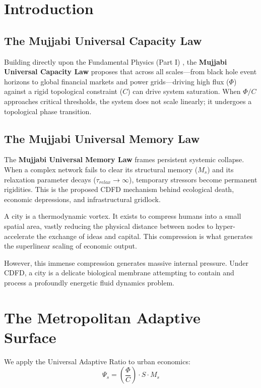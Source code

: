 \documentclass[11pt,a4paper]{article}
\begin{document}
\section{Introduction}

\subsection{The Mujjabi Universal Capacity Law}
Building directly upon the Fundamental Physics (Part I) \cite{MujjabiPartI2026}, the \textbf{Mujjabi Universal Capacity Law} proposes that across all scales---from black hole event horizons to global financial markets and power grids---driving high flux ($\Phi$) against a rigid topological constraint ($C$) can drive system saturation. When $\Phi/C$ approaches critical thresholds, the system does not scale linearly; it undergoes a topological phase transition.

\subsection{The Mujjabi Universal Memory Law}
The \textbf{Mujjabi Universal Memory Law} frames persistent systemic collapse. When a complex network fails to clear its structural memory ($M_s$) and its relaxation parameter decays ($\tau_{relax} \to \infty$), temporary stressors become permanent rigidities. This is the proposed CDFD mechanism behind ecological death, economic depressions, and infrastructural gridlock.

A city is a thermodynamic vortex. It exists to compress humans into a small spatial area, vastly reducing the physical distance between nodes to hyper-accelerate the exchange of ideas and capital. This compression is what generates the superlinear scaling of economic output.

However, this immense compression generates massive internal pressure. Under CDFD, a city is a delicate biological membrane attempting to contain and process a profoundly energetic fluid dynamics problem.

\section{The Metropolitan Adaptive Surface}
We apply the Universal Adaptive Ratio to urban economics:
\begin{equation}
    \Psi_s = \left( \frac{\Phi}{C} \right) \cdot S \cdot M_s
\end{equation}
\end{document}
